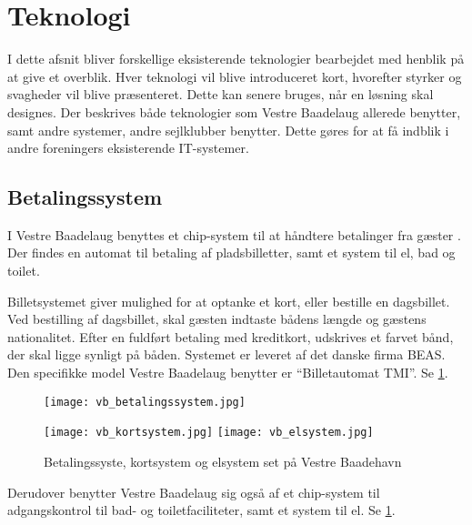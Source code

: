 \section{Teknologi} %
\label{sec:Teknologi}

I dette afsnit bliver forskellige eksisterende teknologier bearbejdet med henblik på at give et overblik. Hver teknologi vil blive introduceret kort, hvorefter styrker og svagheder vil blive præsenteret. Dette kan senere bruges, når en løsning skal designes. Der beskrives både teknologier som Vestre Baadelaug allerede benytter, samt andre systemer, andre sejlklubber benytter. Dette gøres for at få indblik i andre foreningers eksisterende IT-systemer. 


\subsection{Betalingssystem} %
\label{sub:tek_betaling}

I Vestre Baadelaug benyttes et chip-system til at håndtere betalinger fra gæster \cite{int_hf}. Der findes en automat til betaling af pladsbilletter, samt et system til el, bad og toilet.

Billetsystemet giver mulighed for at optanke et kort, eller bestille en dagsbillet. Ved bestilling af dagsbillet, skal gæsten indtaste bådens længde og gæstens nationalitet. Efter en fuldført betaling med kreditkort, udskrives et farvet bånd, der skal ligge synligt på båden. Systemet er leveret af det danske firma BEAS. Den specifikke model Vestre Baadelaug benytter er \enquote{Billetautomat TMI}. Se \cref{fig:vb_systemer}.

\begin{figure}[h]
  \centering
  \begin{minipage}{0.45\textwidth}
    \texttt{[image: vb\_betalingssystem.jpg]}
  \end{minipage}
  \begin{minipage}{0.45\textwidth}
    \texttt{[image: vb\_kortsystem.jpg]}
    \texttt{[image: vb\_elsystem.jpg]}
  \end{minipage}
    \caption{Betalingssyste, kortsystem og elsystem set på Vestre Baadehavn}
    \label{fig:vb_systemer}
\end{figure}

Derudover benytter Vestre Baadelaug sig også af et chip-system til adgangskontrol til bad- og toiletfaciliteter, samt et system til el. Se \cref{fig:vb_systemer}.

